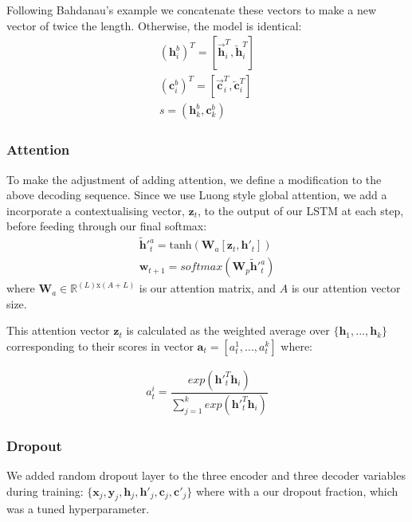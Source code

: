 Following Bahdanau's example we concatenate these vectors to make a new vector of twice the length. Otherwise, the model is identical:
\begin{align}
(\textbf{h}^b_i)^T = [\overrightarrow{\textbf{h}}^T_i,\overleftarrow{\textbf{h}}^T_i ] \\
(\textbf{c}^b_i)^T = [\overrightarrow{\textbf{c}}^T_i,\overleftarrow{\textbf{c}}^T_i ] \\
s = (\textbf{h}^b_k, \textbf{c}^b_k)
\end{align}

\subsubsection{Attention}

To make the adjustment of adding attention, we define a modification to the above decoding sequence. Since we use Luong\cite{luong_effective_2015} style global attention, we add a incorporate a contextualising vector, $\textbf{z}_t$, to the output of our LSTM at each step, before feeding through our final softmax:
\begin{align}
    \tilde{\textbf{h}}'^a_t =  \text{tanh}(\textbf{W}_a[\textbf{z}_t, \textbf{h}'_t])\\
    \textbf{w}_{t+1} = softmax(\textbf{W}_p\tilde{\textbf{h}}'^a_t) \label{eq:s2syw}  
\end{align}
where $\textbf{W}_a \in \mathbb{R}^{(L)\text{x}(A+L)} $ is our attention matrix, and 
$A$ is our attention vector size.

This attention vector $\textbf{z}_t$ is calculated as the weighted average over  $\{\textbf{h}_1,...,\textbf{h}_k\}$ corresponding to their scores in vector $\textbf{a}_t = [a_t^1,...,a_t^k]$ where:

\begin{align}
    a_t^i = \dfrac{exp(\mathbf{h}'^{T}_t\mathbf{h}_i)}{\sum_{j=1}^kexp(\mathbf{h}'^{T}_t\mathbf{h}_i)} 
\end{align}

\subsubsection{Dropout}

We added random dropout layer to the three encoder and three decoder variables during training:
$\{\textbf{x}_j, \textbf{y}_j, \textbf{h}_j, \textbf{h}'_j, \textbf{c}_j, \textbf{c}'_j\}$ where with a our dropout fraction, which was a tuned hyperparameter. 

